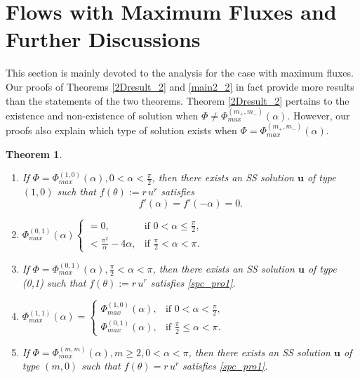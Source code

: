 \documentclass[reqno,12pt]{amsart}
\newtheorem{theorem}{Theorem}[section]
\newcommand{\Bu}{{\boldsymbol{u}}}
\begin{document}


\section{Flows with Maximum Fluxes and Further Discussions} 
\label{sum}

This section is mainly devoted to the analysis for the case with maximum fluxes. Our proofs of  Theorems \ref{2Dresult_2} and \ref{main2_2} in fact provide more results than the statements of the two theorems. Theorem \ref{2Dresult_2} pertains to the existence and non-existence of  solution when $\Phi\neq \Phi^{(m_+,m_-)}_{max}(\alpha)$. However, our proofs also explain which type of solution exists when $\Phi=\Phi^{(m_+,m_-)}_{max}(\alpha)$.
\begin{theorem}
\label{limitc}
            \begin{enumerate}
            \item If $\Phi=\Phi^{(1,0)}_{max}(\alpha),0<\alpha<\frac{\pi}{2}$, then there exists an SS solution $\Bu$ of type $(1,0)$ such that $f(\theta):=r\,u^r$ satisfies 
                \begin{equation}
                \label{spc_pro1}
            f'(\alpha)=f'(-\alpha)=0.
                \end{equation}
            \item 
                $
                \Phi^{(0,1)}_{max} (\alpha) 
                \begin{cases}
                    =0, & \text{if }0<\alpha \leq \frac{\pi}{2},
                    \\
                    <\frac{\pi^2}{\alpha}-4\alpha, & \text{if } \frac{\pi}{2} <\alpha <\pi.
                \end{cases}
                $
            \item 
            If $\Phi= \Phi^{(0,1)}_{max}(\alpha), \frac{\pi}{2}<\alpha<\pi$, then there exists an SS solution $\Bu$ of type (0,1) such that $f(\theta):=r\,u^r$ satisfies \eqref{spc_pro1}.
            \item
            $
            \Phi^{(1,1)}_{max} (\alpha)
            =
            \begin{cases}
                \Phi^{(1,0)}_{max} (\alpha), & \text{if }  0<\alpha < \frac{\pi}{2},
                \\
                \Phi^{(0,1)}_{max} (\alpha), & \text{if }\frac{\pi}{2}\leq \alpha < \pi.
            \end{cases}
            $
            \item 
            If $\Phi=\Phi^{(m,m)}_{max}(\alpha),m\geq 2, 0<\alpha<\pi$, then there exists an SS solution $\Bu$ of type $(m,0)$ such that
            $f(\theta)=r\,u^r$ satisfies \eqref{spc_pro1}.


\end{enumerate}
\end{theorem}
\end{document}
